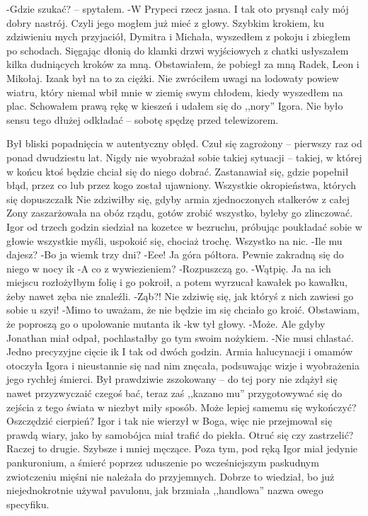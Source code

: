 \documentclass[../MAIN.tex]{subfiles}
\begin{document}
-Gdzie szukać? -- spytałem.
-W Prypeci rzecz jasna.
I tak oto prysnął cały mój dobry nastrój. Czyli jego mogłem już mieć z głowy.
Szybkim krokiem, ku zdziwieniu mych przyjaciół, Dymitra i Michała, wyszedłem z pokoju i zbiegłem po schodach. Sięgając dłonią do klamki drzwi wyjściowych z chatki usłyszałem kilka dudniących kroków za mną. Obstawiałem, że pobiegł za mną Radek, Leon i Mikołaj. Izaak był na to za ciężki.
Nie zwróciłem uwagi na lodowaty powiew wiatru, który niemal wbił mnie w ziemię swym chłodem, kiedy wyszedłem na plac. Schowałem prawą rękę w kieszeń i udałem się do ,,nory'' Igora. Nie było sensu tego dłużej odkładać -- sobotę spędzę przed telewizorem.


Był bliski popadnięcia w autentyczny obłęd.
Czuł się zagrożony -- pierwszy raz od ponad dwudziestu lat. Nigdy nie wyobrażał sobie takiej sytuacji -- takiej, w której w końcu ktoś będzie chciał się do niego dobrać.
Zastanawiał się, gdzie popełnił błąd, przez co lub przez kogo został ujawniony. Wszystkie okropieństwa, których się dopuszczał\3k
Nie zdziwiłby się, gdyby armia zjednoczonych stalkerów z całej Zony zaszarżowała na obóz rządu, gotów zrobić wszystko, byleby go zlinczować.
Igor od trzech godzin siedział na kozetce w bezruchu, próbując poukładać sobie w głowie wszystkie myśli, uspokoić się, chociaż trochę. Wszystko na nic.
-Ile mu dajesz?
-Bo ja wiem\3k trzy dni?
-Eee! Ja góra półtora. Pewnie zakradną się do niego w nocy i\3k
-A co z wywiezieniem?
-Rozpuszczą go.
-Wątpię. Ja na ich miejscu rozłożyłbym folię i go pokroił, a potem wyrzucał kawałek po kawałku, żeby nawet zęba nie znaleźli.
-Ząb?! Nie zdziwię się, jak któryś z nich zawiesi go sobie u szyi!
-Mimo to uważam, że nie będzie im się chciało go kroić. Obstawiam, że poproszą go o upolowanie mutanta i\3k
-\3kw tył głowy.
-Może. Ale gdyby Jonathan miał odpał, pochlastałby go tym swoim nożykiem.
-Nie musi chlastać. Jedno precyzyjne cięcie i\3k
I tak od dwóch godzin.
Armia halucynacji i omamów otoczyła Igora i nieustannie się nad nim znęcała, podsuwając wizje i wyobrażenia jego rychłej śmierci. Był prawdziwie zszokowany -- do tej pory nie zdążył się nawet przyzwyczaić czegoś bać, teraz zaś ,,kazano mu'' przygotowywać się do zejścia z tego świata w niezbyt miły sposób.
Może lepiej samemu się wykończyć? Oszczędzić cierpień? Igor i tak nie wierzył w Boga, więc nie przejmował się prawdą wiary, jako by samobójca miał trafić do piekła.
Otruć się czy zastrzelić? Raczej to drugie. Szybsze i mniej męczące.
Poza tym, pod ręką Igor miał jedynie pankuronium, a śmierć poprzez uduszenie po wcześniejszym paskudnym zwiotczeniu mięśni nie należała do przyjemnych. Dobrze to wiedział, bo już niejednokrotnie używał pavulonu, jak brzmiała ,,handlowa'' nazwa owego specyfiku.
\end{document}
